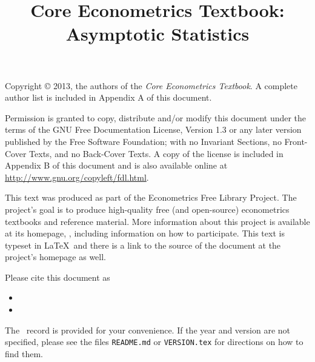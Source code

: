 \documentclass{tex/tufte-handout}
\title{Core Econometrics Textbook: Asymptotic Statistics}
\begin{document}
\maketitle

\bigskip\noindent%
Copyright © 2013, the authors of the \textit{Core Econometrics Textbook}.
A complete author list is included in Appendix A of this document.

Permission is granted to copy, distribute and/or modify this document
under the terms of the GNU Free Documentation License, Version 1.3 or
any later version published by the Free Software Foundation; with no
Invariant Sections, no Front-Cover Texts, and no Back-Cover Texts.  A
copy of the license is included in Appendix B of this document and is
also available online at \url{http://www.gnu.org/copyleft/fdl.html}.

This text was produced as part of the Econometrics Free Library
Project.  The project's goal is to produce high-quality free (and
open-source) econometrics textbooks and reference material.  More
information about this project is available at its homepage,
\homepage, including information on how
to participate.  This text is typeset in \LaTeX\ and there is a link
to the source of the document at the project's homepage as well.

Please cite this document as
\begin{itemize}
\item[] 
\item[] 
\end{itemize}
The \BibTeX\ record is provided for your convenience.
If the year and version are not specified, please see the files
\texttt{README.md} or \texttt{VERSION.tex} for directions on how to
find them.

\tableofcontents










\end{document}
